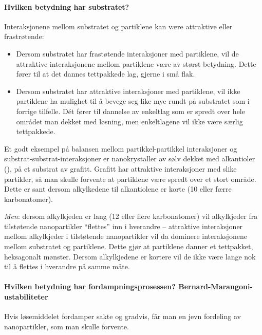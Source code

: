 \paragraph{Hvilken betydning har substratet?} Interaksjonene mellom substratet og partiklene kan være attraktive eller frastrøtende:
\begin{itemize}
	\item Dersom substratet har frastøtende interaksjoner med partiklene, vil de attraktive interaksjonene mellom partiklene være av størst betydning. Dette fører til at det dannes tettpakkede lag, gjerne i små flak.
 	\item Dersom substratet har attraktive interaksjoner med partiklene, vil ikke partiklene ha mulighet til å bevege seg like mye rundt på substratet som i forrige tilfelle. Dét fører til dannelse av enkeltlag som er spredt over hele området man dekket med løsning, men enkeltlagene vil ikke være særlig tettpakkede.
 \end{itemize}
Et godt eksempel på balansen mellom partikkel-partikkel interaksjoner og substrat-substrat-interaksjoner er nanokrystaller av sølv dekket med alkantioler (), på et substrat av grafitt. Grafitt har attraktive interaksjoner med slike partikler, så man skulle forvente at partiklene være spredt over et stort område. Dette er sant dersom alkylkedene til alkantiolene er korte (10 eller færre karbonatomer).

\emph{Men}: dersom alkylkjeden er lang (12 eller flere karbonatomer) vil alkylkjeder fra tilstøtende nanopartikler ``flettes'' inn i hverandre -- attraktive interaksjoner mellom alkylkjeder i tilstøtende nanopartikler vil da dominere interaksjonene mellom substratet og partiklene. Dette gjør at partiklene danner et tettpakket, heksagonalt mønster. Dersom alkylkjedene er kortere vil de ikke være lange nok til å flettes i hverandre på samme måte.

\paragraph{Hvilken betydning har fordampningsprosessen? Bernard-Marangoni-ustabiliteter} Hvis løsemiddelet fordamper sakte og gradvis, får man en jevn fordeling av nanopartikler, som man skulle forvente. 

